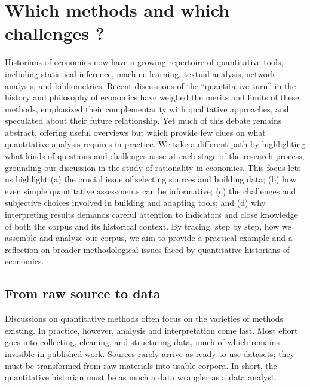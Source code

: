 \documentclass[
]{interact}
\begin{document}
\section{\texorpdfstring{\textbf{Which methods and which challenges
?}}{Which methods and which challenges ?}}\label{which-methods-and-which-challenges}

Historians of economics now have a growing repertoire of quantitative
tools, including statistical inference, machine learning, textual
analysis, network analysis, and bibliometrics. Recent discussions of the
``quantitative turn'' in the history and philosophy of economics have
weighed the merits and limits of these methods, emphasized their
complementarity with qualitative approaches, and speculated about their
future relationship. Yet much of this debate remains abstract, offering
useful overviews but which provide few clues on what quantitative
analysis requires in practice. We take a different path by highlighting
what kinds of questions and challenges arise at each stage of the
research process, grounding our discussion in the study of rationality
in economics. This focus lets us highlight (a) the crucial issue of
selecting sources and building data; (b) how even simple quantitative
assessments can be informative; (c) the challenges and subjective
choices involved in building and adapting tools; and (d) why
interpreting results demands careful attention to indicators and close
knowledge of both the corpus and its historical context. By tracing,
step by step, how we assemble and analyze our corpus, we aim to provide
a practical example and a reflection on broader methodological issues
faced by quantitative historians of economics.

\subsection{From raw source to data}\label{from-raw-source-to-data}

Discussions on quantitative methods often focus on the varieties of
methods existing. In practice, however, analysis and interpretation come
last. Most effort goes into collecting, cleaning, and structuring data,
much of which remains invisible in published work. Sources rarely arrive
as ready-to-use datasets; they must be transformed from raw materials
into usable corpora. In short, the quantitative historian must be as
much a data wrangler as a data analyst.
\end{document}
